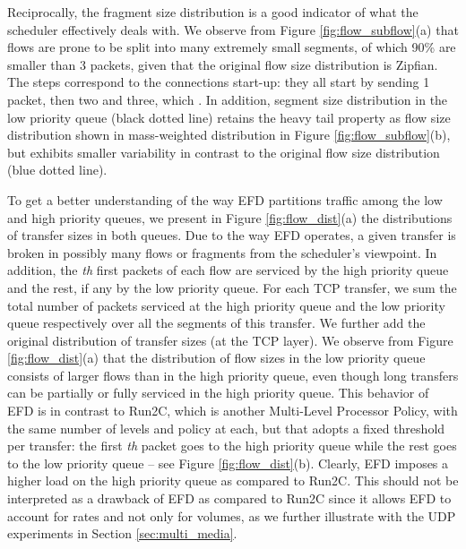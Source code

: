 \documentclass[preprint,12pt]{elsarticle}
\begin{document}
Reciprocally,  the  fragment size distribution is a good indicator of what the scheduler effectively deals with. 
We observe from Figure \ref{fig:flow_subflow}(a) that flows are prone to be split into many extremely small segments, of which 90\% are smaller than 3 packets, given that the original flow size distribution is Zipfian. The steps correspond to the connections start-up: they all start by sending 1 packet, then two and three, which . In addition, segment size distribution in the low priority queue (black dotted line) retains the heavy tail property as flow size distribution shown in mass-weighted distribution in Figure \ref{fig:flow_subflow}(b), but exhibits smaller variability in contrast to the original flow size distribution (blue dotted line). 


To get a better understanding of the way EFD partitions traffic among the low and high priority queues, we present in Figure \ref{fig:flow_dist}(a) the distributions of transfer sizes in both queues. Due to the way EFD operates, a given transfer is broken in possibly many flows or fragments from the scheduler's viewpoint. In addition, the \textit{th} first packets of each flow are serviced by the high priority queue and the rest, if any by the low priority queue. For each TCP transfer, we sum the total number of packets serviced at the high priority queue and the low priority queue respectively over all the segments of this transfer. We further add the original distribution of transfer sizes (at the TCP layer). We observe from  Figure \ref{fig:flow_dist}(a) that the distribution of flow sizes  in the low priority queue consists of larger flows than in the high priority queue, even though long transfers can be partially or fully serviced in the high priority queue. This behavior of EFD is in contrast to Run2C, which is another Multi-Level Processor Policy, with the same number of levels and policy at each, but that adopts a fixed threshold per transfer: the first \textit{th} packet goes to the high priority queue while the rest goes to the low priority queue -- see  Figure \ref{fig:flow_dist}(b). Clearly, EFD imposes a higher load on the high priority queue as compared to Run2C. This should not be interpreted as a drawback of EFD as compared to Run2C since it allows EFD to account for rates and not only for volumes, as we further illustrate with the UDP experiments in Section \ref{sec:multi_media}. 
\end{document}
